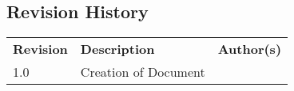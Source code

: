\begin{center}
\section*{Revision History}
\begin{table}[H]
\begin{tabular}{|C{2cm}|P{9cm}|C{4cm}|}
\hline
\textbf{Revision}	&	\textbf{Description}	&	\textbf{Author(s)}	\\\hhline{|=|=|=|}
1.0 &	Creation of Document	&	\\
\hline


\end{tabular}
\end{table}

\end{center}